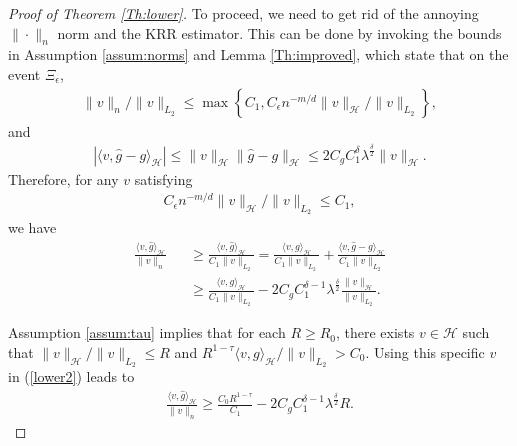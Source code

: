 \documentclass[12pt]{article}
\theoremstyle{plain}
\theoremstyle{remark}
\begin{document}
\begin{proof}[Proof of Theorem \ref{Th:lower}]
    To proceed, we need to get rid of the annoying $\|\cdot\|_n$ norm and the KRR estimator. This can be done by invoking the bounds in Assumption \ref{assum:norms} and Lemma \ref{Th:improved}, which state that on the event $\Xi_\epsilon$,
    \begin{eqnarray*}
        \|v\|_n/\|v\|_{L_2}\leq \max\left\{C_1,C_\epsilon n^{-m/d}\|v\|_{\mathcal{H}}/\|v\|_{L_2}\right\},
    \end{eqnarray*}
    and
    \begin{eqnarray*}
        |\langle v,\hat{g}-g\rangle_\mathcal{H}|\leq \|v\|_\mathcal{H}\|\hat{g}-g\|_\mathcal{H} \leq 2C_gC_1^\delta\lambda^{\frac{\delta}{2}}\|v\|_\mathcal{H}.
    \end{eqnarray*}
    Therefore, for any $v$ satisfying 
    \begin{eqnarray}\label{vcondition}
        C_\epsilon n^{-m/d}\|v\|_{\mathcal{H}}/\|v\|_{L_2}\leq C_1,
    \end{eqnarray}
    we have
    \begin{eqnarray}\label{lower2}
        \frac{\langle v,\hat{g}\rangle_\mathcal{H}}{\|v\|_n}&&\geq \frac{\langle v,\hat{g}\rangle_\mathcal{H}}{C_1\|v\|_{L_2}}=\frac{\langle v,g\rangle_\mathcal{H}}{C_1\|v\|_{L_2}}+\frac{\langle v,\hat{g}-g\rangle_\mathcal{H}}{C_1\|v\|_{L_2}}\nonumber\\
        &&\geq \frac{\langle v,g\rangle_\mathcal{H}}{C_1\|v\|_{L_2}}-2C_gC_1^{\delta-1}\lambda^{\frac{\delta}{2}}\frac{\|v\|_\mathcal{H}}{\|v\|_{L_2}}.
    \end{eqnarray}

    Assumption \ref{assum:tau} implies that for each $R\geq R_0$, there exists $v\in\mathcal{H}$ such that $\|v\|_{\mathcal{H}}/\|v\|_{L_2}\leq R$ and $R^{1-\tau}\langle v,g\rangle_\mathcal{H}/\|v\|_{L_2}>C_0$. Using this specific $v$ in (\ref{lower2}) leads to
    \begin{eqnarray}\label{lower3}
        \frac{\langle v,\hat{g}\rangle_\mathcal{H}}{\|v\|_n}\geq \frac{C_0 R^{1-\tau}}{C_1}-2C_gC_1^{\delta-1}\lambda^{\frac{\delta}{2}}R.
    \end{eqnarray}


\end{proof}
\end{document}
